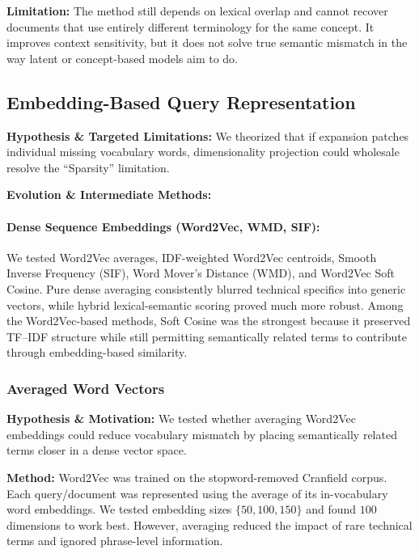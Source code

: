 \documentclass[runningheads]{llncs}
\begin{document}
\textbf{Limitation:}
The method still depends on lexical overlap and cannot recover documents that use entirely different terminology for the same concept. It improves context sensitivity, but it does not solve true semantic mismatch in the way latent or concept-based models aim to do.

\subsection{Embedding-Based Query Representation}
\textbf{Hypothesis \& Targeted Limitations:} We theorized that if expansion patches individual missing vocabulary words, dimensionality projection could wholesale resolve the ``Sparsity'' limitation.

\textbf{Evolution \& Intermediate Methods:}
\paragraph{Dense Sequence Embeddings (Word2Vec, WMD, SIF):} We tested Word2Vec averages, IDF-weighted Word2Vec centroids, Smooth Inverse Frequency (SIF), Word Mover's Distance (WMD), and Word2Vec Soft Cosine. Pure dense averaging consistently blurred technical specifics into generic vectors, while hybrid lexical-semantic scoring proved much more robust. Among the Word2Vec-based methods, Soft Cosine was the strongest because it preserved TF--IDF structure while still permitting semantically related terms to contribute through embedding-based similarity.

\subsubsection{Averaged Word Vectors}

\textbf{Hypothesis \& Motivation:}  
We tested whether averaging Word2Vec embeddings could reduce vocabulary mismatch by placing semantically related terms closer in a dense vector space.

\textbf{Method:}  
Word2Vec was trained on the stopword-removed Cranfield corpus. Each query/document was represented using the average of its in-vocabulary word embeddings. We tested embedding sizes $\{50,100,150\}$ and found $100$ dimensions to work best. However, averaging reduced the impact of rare technical terms and ignored phrase-level information.
\end{document}
